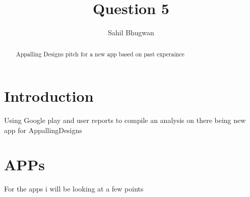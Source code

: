 \documentclass[11pt,preprint, authoryear]{elsarticle}
\numberwithin{equation}{section}
\numberwithin{figure}{section}
\numberwithin{table}{section}
\begin{document}
\begin{frontmatter}  %

\title{Question 5}





\author[Add1]{Sahil Bhugwan}







\begin{abstract}
\small{
Appalling Designs pitch for a new app based on past experaince
}
\end{abstract}

\vspace{1cm}





\vspace{0.5cm}

\end{frontmatter}



\pagestyle{fancy}
\chead{}
\rhead{}
\lfoot{}
\rfoot{}
\lhead{}
\cfoot{}


\headsep 35pt %




\hypertarget{introduction}{%
\section{\texorpdfstring{Introduction
\label{Introduction}}{Introduction }}\label{introduction}}

Using Google play and user reports to compile an analysis on there being
new app for AppallingDesigns

\hypertarget{apps}{%
\section*{APPs}\label{apps}}

For the apps i will be looking at a few points
\end{document}

